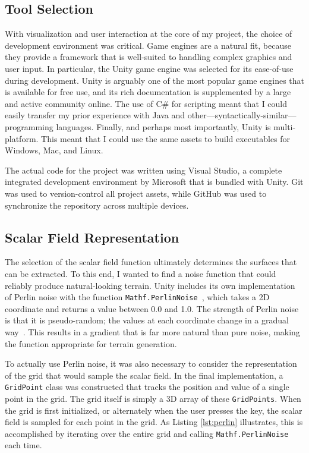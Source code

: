 \documentclass[pageno]{jpaper}
\begin{document}
\subsection{Tool Selection}

With visualization and user interaction at the core of my project, the choice of development environment was critical. Game engines are a natural fit, because they provide a framework that is well-suited to handling complex graphics and user input. In particular, the Unity game engine was selected for its ease-of-use during development. Unity is arguably one of the most popular game engines that is available for free use, and its rich documentation is supplemented by a large and active community online. The use of C\# for scripting meant that I could easily transfer my prior experience with Java and other—syntactically-similar—programming languages. Finally, and perhaps most importantly, Unity is multi-platform. This meant that I could use the same assets to build executables for Windows, Mac, and Linux.

The actual code for the project was written using Visual Studio, a complete integrated development environment by Microsoft that is bundled with Unity. Git was used to version-control all project assets, while GitHub was used to synchronize the repository across multiple devices.

\subsection{Scalar Field Representation}

The selection of the scalar field function ultimately determines the surfaces that can be extracted. To this end, I wanted to find a noise function that could reliably produce natural-looking terrain. Unity includes its own implementation of Perlin noise with the function \texttt{Mathf.PerlinNoise}~\cite{unityperlin}, which takes a 2D coordinate and returns a value between 0.0 and 1.0. The strength of Perlin noise is that it is pseudo-random; the values at each coordinate change in a gradual way~\cite{unityperlin}. This results in a gradient that is far more natural than pure noise, making the function appropriate for terrain generation.

To actually use Perlin noise, it was also necessary to consider the representation of the grid that would sample the scalar field. In the final implementation, a \texttt{GridPoint} class was constructed that tracks the position and value of a single point in the grid. The grid itself is simply a 3D array of these \texttt{GridPoints}. When the grid is first initialized, or alternately when the user presses the  key, the scalar field is sampled for each point in the grid. As Listing \ref{lst:perlin} illustrates, this is accomplished by iterating over the entire grid and calling \texttt{Mathf.PerlinNoise} each time.
\end{document}

